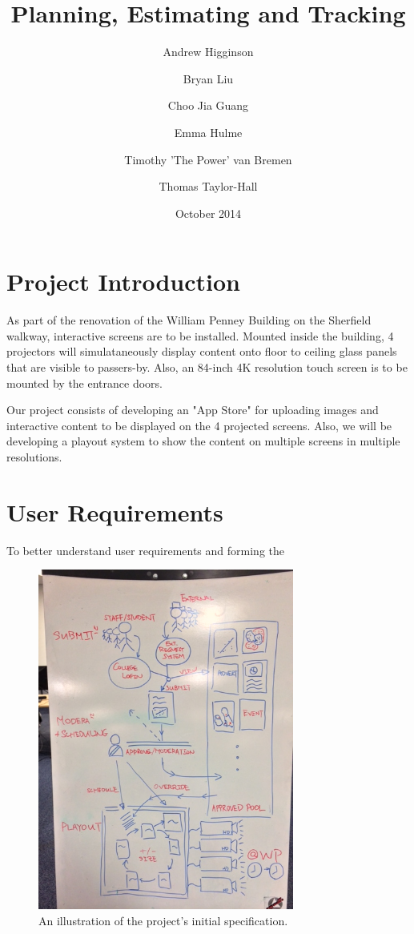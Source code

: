 \documentclass[a4paper]{article}
\begin{document}
\title{Planning, Estimating and Tracking}
\author{Andrew Higginson \and Bryan Liu \and Choo Jia Guang \and Emma Hulme \and 
Timothy 'The Power' van Bremen \and Thomas Taylor-Hall}
\date{October 2014}
\maketitle

\linespread{1.1}

\section{Project Introduction}
As part of the renovation of the William Penney Building on the Sherfield 
walkway, interactive screens are to be installed. Mounted inside the building, 4
projectors will simulataneously display content onto floor to ceiling glass
panels that are visible to passers-by. Also, an 84-inch 4K resolution touch 
screen is to be mounted by the entrance doors. 

Our project consists of developing an "App Store" for uploading images and 
interactive content to be displayed on the 4 projected screens. Also, we will be
developing a playout system to show the content on multiple screens in multiple 
resolutions.

\section{User Requirements} \label{section:req}

To better understand user requirements and forming the 

\begin{figure}[h]
  \centering
    \includegraphics[width = 0.75\textwidth, angle = 270]{./planning/userreq.jpg}

  \caption{An illustration of the project's initial specification.}
  \label{fig:userreq}
\end{figure}
\end{document}
